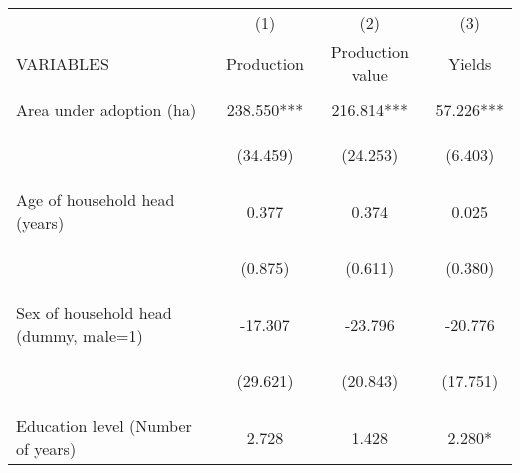 \begin{center}
\begin{tabular}{lccc} \hline
 & (1) & (2) & (3) \\
VARIABLES & Production & Production value & Yields \\ \hline
\vspace{4pt} & \begin{footnotesize}\end{footnotesize} & \begin{footnotesize}\end{footnotesize} & \begin{footnotesize}\end{footnotesize} \\
Area under adoption (ha) & 238.550*** & 216.814*** & 57.226*** \\
\vspace{4pt} & \begin{footnotesize}(34.459)\end{footnotesize} & \begin{footnotesize}(24.253)\end{footnotesize} & \begin{footnotesize}(6.403)\end{footnotesize} \\
Age of household head (years) & 0.377 & 0.374 & 0.025 \\
\vspace{4pt} & \begin{footnotesize}(0.875)\end{footnotesize} & \begin{footnotesize}(0.611)\end{footnotesize} & \begin{footnotesize}(0.380)\end{footnotesize} \\
Sex of household head (dummy, male=1) & -17.307 & -23.796 & -20.776 \\
\vspace{4pt} & \begin{footnotesize}(29.621)\end{footnotesize} & \begin{footnotesize}(20.843)\end{footnotesize} & \begin{footnotesize}(17.751)\end{footnotesize} \\
Education level (Number of years) & 2.728 & 1.428 & 2.280* \\

\end{tabular}
\end{center}

